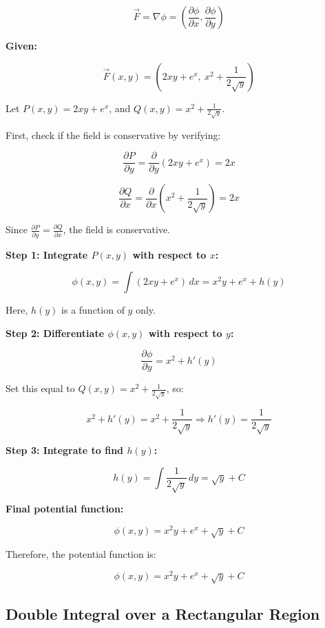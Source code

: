 \[
    \vec{F} = \nabla \phi = \left( \frac{\partial \phi}{\partial x}, \frac{\partial \phi}{\partial y} \right)
\]

\textbf{Given:}

\[
    \vec{F}(x, y) = \left(2xy + e^x,\ x^2 + \frac{1}{2\sqrt{y}}\right)
\]

Let \( P(x, y) = 2xy + e^x \), and \( Q(x, y) = x^2 + \frac{1}{2\sqrt{y}} \).

First, check if the field is conservative by verifying:

\[
    \frac{\partial P}{\partial y} = \frac{\partial}{\partial y}(2xy + e^x) = 2x
\]

\[
    \frac{\partial Q}{\partial x} = \frac{\partial}{\partial x}\left(x^2 + \frac{1}{2\sqrt{y}}\right) = 2x
\]

Since \( \frac{\partial P}{\partial y} = \frac{\partial Q}{\partial x} \), the field is conservative.
\vspace{\baselineskip}

\textbf{Step 1: Integrate \( P(x, y) \) with respect to \( x \):}

\[
    \phi(x, y) = \int (2xy + e^x)\,dx = x^2y + e^x + h(y)
\]

Here, \( h(y) \) is a function of \( y \) only.
\vspace{\baselineskip}

\textbf{Step 2: Differentiate \( \phi(x, y) \) with respect to \( y \):}

\[
    \frac{\partial \phi}{\partial y} = x^2 + h'(y)
\]

Set this equal to \( Q(x, y) = x^2 + \frac{1}{2\sqrt{y}} \), so:

\[
    x^2 + h'(y) = x^2 + \frac{1}{2\sqrt{y}} \Rightarrow h'(y) = \frac{1}{2\sqrt{y}}
\]

\textbf{Step 3: Integrate to find \( h(y) \):}

\[
    h(y) = \int \frac{1}{2\sqrt{y}}\,dy = \sqrt{y} + C
\]

\textbf{Final potential function:}

\[
    \phi(x, y) = x^2y + e^x + \sqrt{y} + C
\]

Therefore, the potential function is:

\[
\phi(x, y) = x^2y + e^x + \sqrt{y} + C
\]


\subsection{Double Integral over a Rectangular Region}

